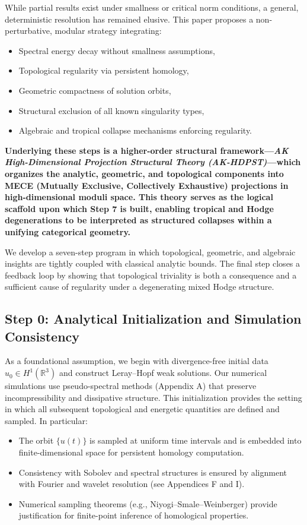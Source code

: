 \documentclass[11pt]{article}
\theoremstyle{definition}
\begin{document}
While partial results exist under smallness or critical norm conditions, a general, deterministic resolution has remained elusive. This paper proposes a non-perturbative, modular strategy integrating:
\begin{itemize}
  \item Spectral energy decay without smallness assumptions,
  \item Topological regularity via persistent homology,
  \item Geometric compactness of solution orbits,
  \item Structural exclusion of all known singularity types,
  \item Algebraic and tropical collapse mechanisms enforcing regularity.
\end{itemize}

\textbf{Underlying these steps is a higher-order structural framework---\textit{AK High-Dimensional Projection Structural Theory (AK-HDPST)}---which organizes the analytic, geometric, and topological components into MECE (Mutually Exclusive, Collectively Exhaustive) projections in high-dimensional moduli space. This theory serves as the logical scaffold upon which Step 7 is built, enabling tropical and Hodge degenerations to be interpreted as structured collapses within a unifying categorical geometry.}

We develop a seven-step program in which topological, geometric, and algebraic insights are tightly coupled with classical analytic bounds. The final step closes a feedback loop by showing that topological triviality is both a consequence and a sufficient cause of regularity under a degenerating mixed Hodge structure.

\subsection*{Step 0: Analytical Initialization and Simulation Consistency}

As a foundational assumption, we begin with divergence-free initial data $u_0 \in H^1(\mathbb{R}^3)$ and construct Leray--Hopf weak solutions. Our numerical simulations use pseudo-spectral methods (Appendix A) that preserve incompressibility and dissipative structure. This initialization provides the setting in which all subsequent topological and energetic quantities are defined and sampled. In particular:
\begin{itemize}
  \item The orbit $\{ u(t) \}$ is sampled at uniform time intervals and is embedded into finite-dimensional space for persistent homology computation.
  \item Consistency with Sobolev and spectral structures is ensured by alignment with Fourier and wavelet resolution (see Appendices F and I).
  \item Numerical sampling theorems (e.g., Niyogi--Smale--Weinberger) provide justification for finite-point inference of homological properties.
\end{itemize}
\end{document}
